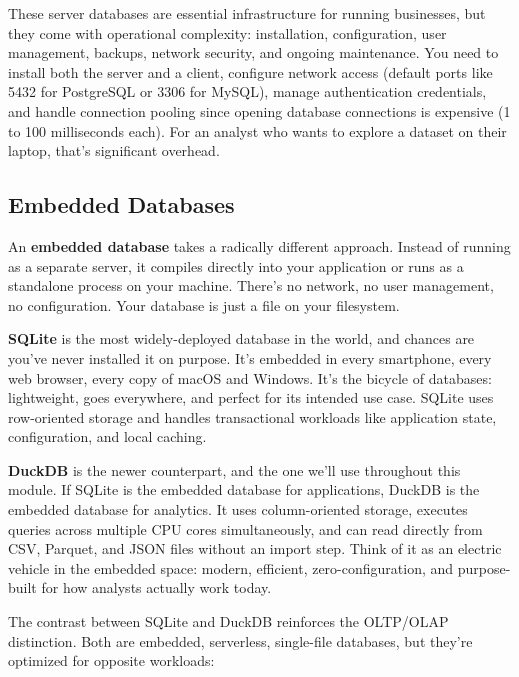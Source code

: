 \documentclass[
  letterpaper,
  DIV=11,
  numbers=noendperiod]{scrreprt}
\begin{document}
These server databases are essential infrastructure for running
businesses, but they come with operational complexity: installation,
configuration, user management, backups, network security, and ongoing
maintenance. You need to install both the server and a client, configure
network access (default ports like 5432 for PostgreSQL or 3306 for
MySQL), manage authentication credentials, and handle connection pooling
since opening database connections is expensive (1 to 100 milliseconds
each). For an analyst who wants to explore a dataset on their laptop,
that's significant overhead.

\subsection{Embedded Databases}\label{embedded-databases}

An \textbf{embedded database} takes a radically different approach.
Instead of running as a separate server, it compiles directly into your
application or runs as a standalone process on your machine. There's no
network, no user management, no configuration. Your database is just a
file on your filesystem.

\textbf{SQLite} is the most widely-deployed database in the world, and
chances are you've never installed it on purpose. It's embedded in every
smartphone, every web browser, every copy of macOS and Windows. It's the
bicycle of databases: lightweight, goes everywhere, and perfect for its
intended use case. SQLite uses row-oriented storage and handles
transactional workloads like application state, configuration, and local
caching.

\textbf{DuckDB} is the newer counterpart, and the one we'll use
throughout this module. If SQLite is the embedded database for
applications, DuckDB is the embedded database for analytics. It uses
column-oriented storage, executes queries across multiple CPU cores
simultaneously, and can read directly from CSV, Parquet, and JSON files
without an import step. Think of it as an electric vehicle in the
embedded space: modern, efficient, zero-configuration, and purpose-built
for how analysts actually work today.

The contrast between SQLite and DuckDB reinforces the OLTP/OLAP
distinction. Both are embedded, serverless, single-file databases, but
they're optimized for opposite workloads:
\end{document}
